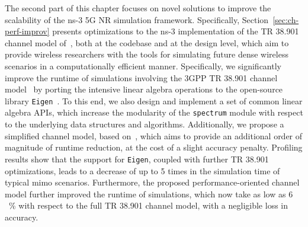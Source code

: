 The second part of this chapter focuses on novel solutions to improve the scalability of the ns-3 5G NR simulation framework. Specifically, Section~\ref{sec:ch-perf-improv} presents optimizations to the ns-3 implementation of the TR 38.901 channel model of~\cite{tommaso:20}, both at the codebase and at the design level, which aim to provide wireless researchers with the tools for simulating future dense wireless scenarios in a computationally efficient manner. Specifically, we significantly improve the runtime of simulations involving the 3GPP TR 38.901 channel model~\cite{TR38901} by porting the intensive linear algebra operations to the open-source library \texttt{Eigen}~\cite{eigenweb}. To this end, we also design and implement a set of common linear algebra APIs, which increase the modularity of the \texttt{spectrum} module with respect to the underlying data structures and algorithms.
Additionally, we propose a simplified channel model, based on~\cite{TR38901}, which aims to provide an additional order of magnitude of runtime reduction, at the cost of a slight accuracy penalty. Profiling results show that the support for \texttt{Eigen}, coupled with further TR 38.901 optimizations, leads to a decrease of up to 5 times in the simulation time of typical \gls{mimo} scenarios. Furthermore, the proposed performance-oriented channel model further improved the runtime of simulations, which now take as low as $6$~\% with respect to the full TR 38.901 channel model, with a negligible loss in accuracy.
